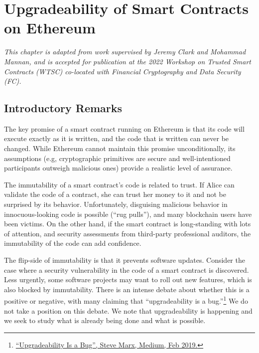 \chapter{Upgradeability of Smart Contracts on Ethereum} 
\label{ch:upgrade}

\textit{
This chapter is adapted from work supervised by Jeremy Clark and Mohammad Mannan, and is accepted for publication at the 2022 Workshop on Trusted Smart Contracts (WTSC) co-located with Financial Cryptography and Data Security (FC).
}

\section{Introductory Remarks}
The key promise of a smart contract running on Ethereum is that its code will execute exactly as it is written, and the code that is written can never be changed. While Ethereum cannot maintain this promise unconditionally, its assumptions (e.g, cryptographic primitives are secure and well-intentioned participants outweigh malicious ones) provide a realistic level of assurance. 

The immutability of a smart contract's code is related to trust. If Alice can validate the code of a contract, she can trust her money to it and not be surprised by its behavior. Unfortunately, disguising malicious behavior in innocuous-looking code is possible (``rug pulls''), and many blockchain users have been victims. On the other hand, if the smart contract is long-standing with lots of attention, and security assessments from third-party professional auditors, the immutability of the code can add confidence. 

The flip-side of immutability is that it prevents software updates. Consider the case where a security vulnerability in the code of a smart contract is discovered. Less urgently, some software projects may want to roll out new features, which is also blocked by immutability. There is an intense debate about whether this is a positive or negative, with many claiming that ``upgradeability is a bug.''\footnote{\href{https://medium.com/consensys-diligence/upgradeability-is-a-bug-dba0203152ce}{``Upgradeability Is a Bug'', Steve Marx, Medium, Feb 2019.}} We do not take a position on this debate. We note that upgradeability is happening and we seek to study what is already being done and what is possible. 

